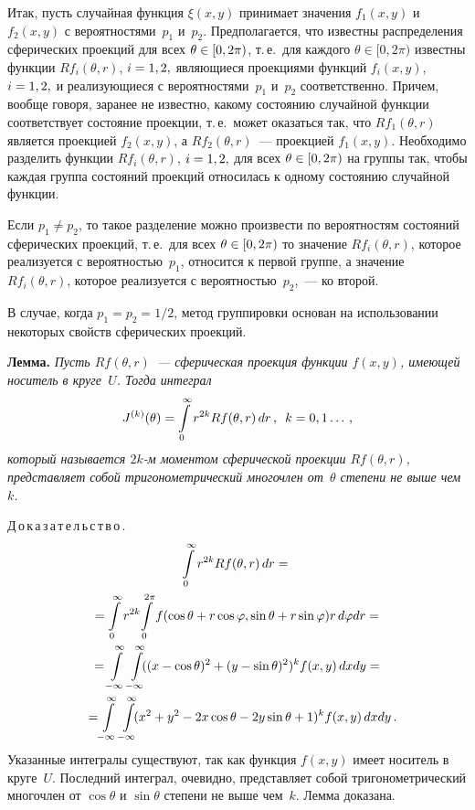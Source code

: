 \begin{multicols}{2}
Итак, пусть случайная функция
$\xi(x,y)$ принимает значения $f_{1}(x,y)$ и $f_{2}(x,y)$ с
вероятностями~$p_{1}$ и~$p_{2}$. Предполагается, что известны
распределения сферических проекций для всех $\theta\hm\in [0,2\pi)$, т.\,е.\ для каждого
$\theta\in [0,2\pi)$ известны функции $Rf_{i}(\theta,r)$, $i\hm=1,2,$
являющиеся проекциями функций $f_{i}(x,y)$, $i\hm=1,2,$ и
реализующиеся с вероятностями~$p_{1}$ и~$p_{2}$ соответственно.
Причем, вообще говоря, заранее не известно, какому состоянию случайной функции соответствует
состояние проекции, т.\,е.\ может оказаться так, что $Rf_{1}(\theta,r)$ является проекцией $f_{2}(x,y)$, а
$Rf_{2}(\theta,r)$~--- проекцией $f_{1}(x,y)$. Необходимо разделить
функции $Rf_{i}(\theta,r)$, $i\hm=1,2,$ для всех $\theta\hm\in [0,2\pi)$ на
группы так, чтобы каждая группа состояний проекций относилась к
одному состоянию случайной функции.

Если $p_{1}\neq p_{2}$, то такое разделение можно произвести по вероятностям состояний
сферических проекций, т.\,е.\ для всех $\theta\hm\in [0,2\pi)$ то значение
$Rf_{i}(\theta,r)$, которое реализуется с вероятностью~$p_{1}$, 
относится к первой группе, а значение $Rf_{i}(\theta,r)$, которое
реализуется с вероятностью~$p_{2}$,~--- ко второй.

В случае, когда $p_{1}=p_{2}={1}/{2}$, метод группировки основан на 
использовании некоторых свойств сферических проекций.

\medskip

\noindent
\textbf{Лемма.} \textit{Пусть $Rf(\theta,r)$~--- сферическая проекция 
функции $f(x,y)$, имеющей носитель в круге~$U$. Тогда интеграл
\begin{equation}
J^{(k)}(\theta)=\int\limits_{0}^{\infty}r^{2k}Rf(\theta,r)\,dr\,,\enskip 
k=0,1\ldots\,,\label{e2-she}
\end{equation}
который называется $2k$-м моментом сферической проекции
$Rf(\theta,r)$, представляет собой тригоно\-мет\-ри\-че\-ский многочлен от~$\theta$ 
степени не выше чем~$k$.}

\medskip

\noindent
Д\,о\,к\,а\,з\,а\,т\,е\,л\,ь\,с\,т\,в\,о\,.\ \
\begin{multline*}
\int\limits_{0}^{\infty}r^{2k}Rf(\theta,r)\,dr={}\\
{}=
\int\limits_{0}^{\infty}r^{2k}\!\int\limits_{0}^{2\pi}f
(\cos\theta+r\cos\varphi,\sin\theta+r\sin\varphi)r\,d\varphi dr={}\\
{}=\int\limits_{-\infty}^{\infty}\int\limits_{-\infty}^{\infty}\!\!((x-\cos\theta)^2+(y-\sin\theta)^2)^kf(x,y)\,dxdy={}\\
{}=\!\int\limits_{-\infty}^{\infty}\int\limits_{-\infty}^{\infty}\!\!(x^2+y^2-2x\cos\theta-2y\sin\theta+1)^kf(x,y)\,dxdy\,.\hspace*{-5.9pt}
\end{multline*}
Указанные интегралы существуют, так как функция $f(x,y)$ имеет
носитель в круге~$U$. Последний интеграл, очевидно, представляет
собой тригонометрический многочлен от $\cos\theta$ и $\sin\theta$
степени не выше чем~$k$. Лемма доказана.


\end{multicols}
